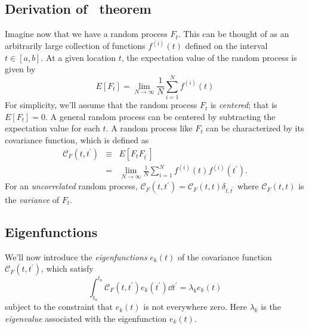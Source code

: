 \subsection{Derivation of \KL\ theorem}
Imagine now that we have a random process $F_t$.  This can be thought of as
an arbitrarily large collection of functions $f^{(i)}(t)$ defined
on the interval
$t \in [a, b]$.  At a given location $t$, the expectation value of the
random process is given by
\begin{equation}
  E[F_t] = \lim_{N \to \infty} \frac{1}{N} \sum_{i=1}^N f^{(i)}(t)
\end{equation}
For simplicity, we'll assume that the random process $F_t$ is {\it
centered}; that is $E[F_t] = 0$.  A general random process can be
centered by subtracting the expectation value for each $t$.
A random process like $F_t$ can be characterized
by its covariance function, which is defined as
\begin{eqnarray}
  \label{eq:corrfunc_def}
  \mathcal{C}_F(t, t^\prime) &\equiv& E[F_t F_{t^\prime}]
  \nonumber\\
  &=& \lim_{N\to\infty}\frac{1}{N} \sum_{i=1}^N
  f^{(i)}(t)f^{(i)}(t^\prime).
\end{eqnarray}
For an {\it uncorrelated} random process,
$\mathcal{C}_F(t, t^\prime) = \mathcal{C}_F(t, t) \delta_{t, t^\prime}$
where $\mathcal{C}_F(t, t) $ is the {\it variance} of $F_t$.

\subsection{Eigenfunctions}
We'll now introduce the {\it eigenfunctions} $e_k(t)$
of the covariance function $\mathcal{C}_F(t, t^\prime)$, which satisfy
\begin{equation}
  \label{eq:eigfunc_def}
  \int_{t_a}^{t_b} \mathcal{C}_F(t, t^\prime) e_k(t^\prime)\dd t^\prime
  = \lambda_k e_k(t)
\end{equation}
subject to the constraint that $e_k(t)$ is not everywhere zero.
Here $\lambda_k$ is the {\it eigenvalue} associated with the
eigenfunction $e_k(t)$.

